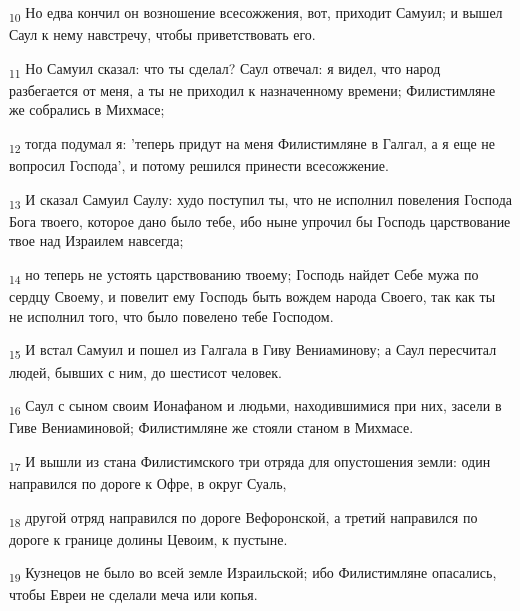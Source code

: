 \begin{tcolorbox}
\textsubscript{10} Но едва кончил он возношение всесожжения, вот, приходит Самуил; и вышел Саул к нему навстречу, чтобы приветствовать его.
\end{tcolorbox}
\begin{tcolorbox}
\textsubscript{11} Но Самуил сказал: что ты сделал? Саул отвечал: я видел, что народ разбегается от меня, а ты не приходил к назначенному времени; Филистимляне же собрались в Михмасе;
\end{tcolorbox}
\begin{tcolorbox}
\textsubscript{12} тогда подумал я: 'теперь придут на меня Филистимляне в Галгал, а я еще не вопросил Господа', и потому решился принести всесожжение.
\end{tcolorbox}
\begin{tcolorbox}
\textsubscript{13} И сказал Самуил Саулу: худо поступил ты, что не исполнил повеления Господа Бога твоего, которое дано было тебе, ибо ныне упрочил бы Господь царствование твое над Израилем навсегда;
\end{tcolorbox}
\begin{tcolorbox}
\textsubscript{14} но теперь не устоять царствованию твоему; Господь найдет Себе мужа по сердцу Своему, и повелит ему Господь быть вождем народа Своего, так как ты не исполнил того, что было повелено тебе Господом.
\end{tcolorbox}
\begin{tcolorbox}
\textsubscript{15} И встал Самуил и пошел из Галгала в Гиву Вениаминову; а Саул пересчитал людей, бывших с ним, до шестисот человек.
\end{tcolorbox}
\begin{tcolorbox}
\textsubscript{16} Саул с сыном своим Ионафаном и людьми, находившимися при них, засели в Гиве Вениаминовой; Филистимляне же стояли станом в Михмасе.
\end{tcolorbox}
\begin{tcolorbox}
\textsubscript{17} И вышли из стана Филистимского три отряда для опустошения земли: один направился по дороге к Офре, в округ Суаль,
\end{tcolorbox}
\begin{tcolorbox}
\textsubscript{18} другой отряд направился по дороге Вефоронской, а третий направился по дороге к границе долины Цевоим, к пустыне.
\end{tcolorbox}
\begin{tcolorbox}
\textsubscript{19} Кузнецов не было во всей земле Израильской; ибо Филистимляне опасались, чтобы Евреи не сделали меча или копья.
\end{tcolorbox}
